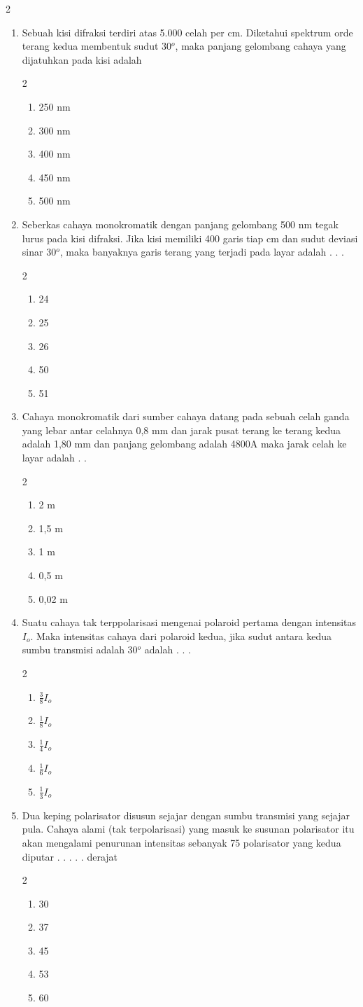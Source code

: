\documentclass[10pt,a4paper]{extarticle}
\newcommand{\pilgani}[1]{                            \vspace{-0.3cm}\begin{multicols}{2}
 \begin{enumerate}[label=\Alph*., itemsep=0pt,topsep=0pt,leftmargin=*,align=Center]#1                     \end{enumerate}
 \phantom{ini cuma sapi, wedus, dan ayam}
 \end{multicols}}
\begin{document}
\begin{multicols*}{2}
\begin{enumerate}
\item Sebuah kisi difraksi terdiri atas 5.000 celah per cm. Diketahui spektrum orde terang kedua
membentuk sudut 30$^o$, maka panjang gelombang cahaya yang dijatuhkan pada kisi adalah
\pilgani{
\item 250 nm
\item 300 nm
\item 400 nm
\item 450 nm
\item 500 nm}
\vspace{4.2cm}

\item Seberkas cahaya monokromatik dengan panjang gelombang 500 nm tegak lurus pada kisi
difraksi. Jika kisi memiliki 400 garis tiap cm dan sudut deviasi sinar 30$^o$, maka banyaknya garis terang yang terjadi pada layar 
adalah . . .
\pilgani{
\item 24
\item 25
\item 26
\item 50
\item 51}
\vspace{4.2cm}
\item Cahaya monokromatik dari sumber cahaya datang pada sebuah celah ganda yang lebar antar
celahnya 0,8 mm dan jarak pusat terang ke terang kedua adalah 1,80 mm dan panjang gelombang adalah
4800A maka jarak celah ke layar adalah . . 
\pilgani{
\item 2 m
\item 1,5 m
\item 1 m
\item 0,5 m
\item 0,02 m
}
\vspace{4.2cm}
\item Suatu cahaya tak terppolarisasi mengenai polaroid pertama dengan intensitas $I_o$.
Maka intensitas cahaya dari polaroid kedua, jika sudut antara kedua sumbu transmisi adalah 30$^o$
adalah . . .
\pilgani{
\item $ \frac{3}{8} I_o$
\item $ \frac{1}{8} I_o$
\item $ \frac{1}{4} I_o$
\item $ \frac{1}{6} I_o$
\item $ \frac{1}{3} I_o$
}
\vspace{4.2cm}
\item Dua keping polarisator disusun sejajar
dengan sumbu transmisi yang sejajar pula.
Cahaya alami (tak terpolarisasi) yang masuk
ke susunan polarisator itu akan mengalami
penurunan intensitas sebanyak 75%
polarisator yang kedua diputar . . . . . derajat
\pilgani{
\item 30
\item 37
\item 45
\item 53
\item 60
}\vspace{4.2cm}


\end{enumerate}
\end{multicols*}
\end{document}
